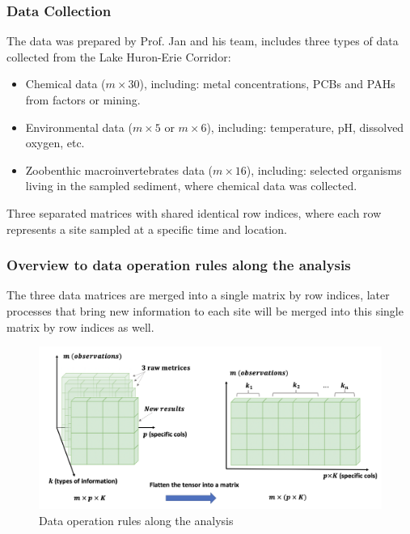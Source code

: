 \documentclass{beamer}
\begin{document}
\begin{frame}
\frametitle{Data Collection}
The data was prepared by Prof. Jan and his team, includes three 
types of data collected from the Lake Huron-Erie Corridor:

\begin{itemize}
    \item Chemical data (\(m \times 30\)), including: metal concentrations, PCBs and PAHs from factors or mining.
    \item Environmental data (\(m \times 5\) or \(m \times 6\)), including: temperature, pH, dissolved oxygen, etc.
    \item Zoobenthic macroinvertebrates data (\(m \times 16\)), including: selected organisms living in the sampled sediment, 
    where chemical data was collected.
\end{itemize}

Three separated matrices with shared identical row indices,
where each row represents a site sampled at a specific time and location.

\end{frame}

\begin{frame}
\frametitle{Overview to data operation rules along the analysis}

The three data matrices are merged into a single matrix by row indices,
later processes that bring new information to each site will be merged into this single matrix by row indices as well.


\begin{figure}
\centering
\includegraphics[width=\textwidth]{figures/p4_rules_for_data_operation.png}
\caption{Data operation rules along the analysis}
\end{figure}

\end{frame}
\end{document}

